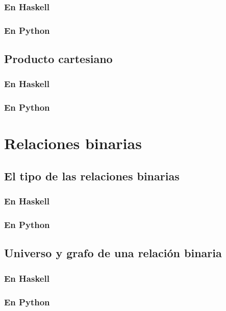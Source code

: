 \documentclass[a4paper,12pt,twoside]{book}
\begin{document}
\subsection{En Haskell}
\subsection{En Python}

\section{Producto cartesiano}
\subsection{En Haskell}
\subsection{En Python}

\chapter{Relaciones binarias}

\minitoc

\section{El tipo de las relaciones binarias}
\subsection{En Haskell}
\subsection{En Python}

\section{Universo y grafo de una relación binaria}
\subsection{En Haskell}
\subsection{En Python}
\end{document}
